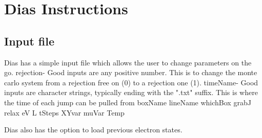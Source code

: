 \chapter{Dias Instructions}
\section{Input file}
Dias has a simple input file which allows the user to change parameters on the go. 
rejection- Good inputs are any positive number. This is to change the monte carlo system from a rejection free on (0) to a rejection one (1). 
timeName- Good inputs are character strings, typically ending with the ".txt" suffix. This is where the time of each jump can be pulled from 
boxName
lineName
whichBox
grabJ
relax
eV
L
tSteps
XYvar
muVar
Temp



Dias also has the option to load previous electron states.
